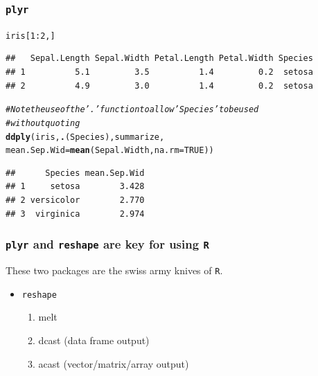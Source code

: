 \documentclass{beamer}\usepackage[]{graphicx}\usepackage[]{color}
\makeatletter
\newcommand{\hlnum}[1]{\textcolor[rgb]{0.686,0.059,0.569}{#1}}%
\newcommand{\hlcom}[1]{\textcolor[rgb]{0.678,0.584,0.686}{\textit{#1}}}%
\newcommand{\hlopt}[1]{\textcolor[rgb]{0,0,0}{#1}}%
\newcommand{\hlstd}[1]{\textcolor[rgb]{0.345,0.345,0.345}{#1}}%
\newcommand{\hlkwc}[1]{\textcolor[rgb]{0.333,0.667,0.333}{#1}}%
\newcommand{\hlkwd}[1]{\textcolor[rgb]{0.737,0.353,0.396}{\textbf{#1}}}%
\newenvironment{kframe}{%
 \def\at@end@of@kframe{}%
 \ifinner\ifhmode%
  \def\at@end@of@kframe{\end{minipage}}%
  \begin{minipage}{\columnwidth}%
 \fi\fi%
 \def\FrameCommand##1{\hskip\@totalleftmargin \hskip-\fboxsep
 \colorbox{shadecolor}{##1}\hskip-\fboxsep
     \hskip-\linewidth \hskip-\@totalleftmargin \hskip\columnwidth}%
 \MakeFramed {\advance\hsize-\width
   \@totalleftmargin\z@ \linewidth\hsize
   \@setminipage}}%
 {\par\unskip\endMakeFramed%
 \at@end@of@kframe}
\newenvironment{knitrout}{}{} %
\makeatother
\begin{document}
\begin{frame}[fragile]
\frametitle{\texttt{plyr}}
\begin{knitrout}\footnotesize
{}\color{fgcolor}\begin{kframe}
\begin{alltt}
\hlstd{iris[}\hlnum{1}\hlopt{:}\hlnum{2}\hlstd{, ]}
\end{alltt}
\begin{verbatim}
##   Sepal.Length Sepal.Width Petal.Length Petal.Width Species
## 1          5.1         3.5          1.4         0.2  setosa
## 2          4.9         3.0          1.4         0.2  setosa
\end{verbatim}
\begin{alltt}
\hlcom{# Note the use of the '.' function to allow 'Species' to be used }
\hlcom{# without quoting}
\hlkwd{ddply}\hlstd{(iris,} \hlkwd{.}\hlstd{(Species), summarize,}
      \hlkwc{mean.Sep.Wid} \hlstd{=} \hlkwd{mean}\hlstd{(Sepal.Width,} \hlkwc{na.rm} \hlstd{=} \hlnum{TRUE}\hlstd{))}
\end{alltt}
\begin{verbatim}
##      Species mean.Sep.Wid
## 1     setosa        3.428
## 2 versicolor        2.770
## 3  virginica        2.974
\end{verbatim}
\end{kframe}
\end{knitrout}

\end{frame}



\begin{frame}[fragile]
\frametitle{\texttt{plyr} and \texttt{reshape} are key for using \texttt{R}}
These two packages are the swiss army knives of \texttt{R}.
\begin{itemize}
    \item \texttt{reshape}
    \begin{enumerate}
    \item melt
    \item dcast (data frame output)
    \item acast (vector/matrix/array output)
    \end{enumerate}
\end{itemize}
\end{frame}

\end{document}
